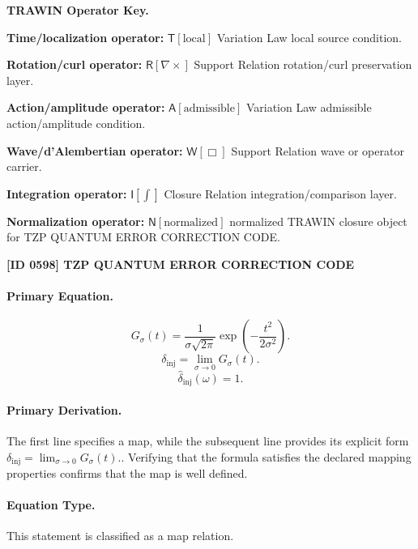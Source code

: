 \par\vspace{0.45\baselineskip}
\noindent\begin{minipage}[t]{\linewidth}
\begingroup
\small
\raggedright
\textbf{TRAWIN Operator Key.}\par
\noindent\textbf{Time/localization operator:} $\mathsf{T}\!\left[\mathrm{local}\right]$ Variation Law local source condition.\par
\noindent\textbf{Rotation/curl operator:} $\mathsf{R}\!\left[\nabla\times\right]$ Support Relation rotation/curl preservation layer.\par
\noindent\textbf{Action/amplitude operator:} $\mathsf{A}\!\left[\mathrm{admissible}\right]$ Variation Law admissible action/amplitude condition.\par
\noindent\textbf{Wave/d'Alembertian operator:} $\mathsf{W}\!\left[\Box\right]$ Support Relation wave or operator carrier.\par
\noindent\textbf{Integration operator:} $\mathsf{I}\!\left[\int\right]$ Closure Relation integration/comparison layer.\par
\noindent\textbf{Normalization operator:} $\mathsf{N}\!\left[\mathrm{normalized}\right]$ normalized TRAWIN closure object for TZP QUANTUM ERROR CORRECTION CODE.\par
\endgroup
\end{minipage}

\clearpage
\noindent\textbf{[ID 0598] TZP QUANTUM ERROR CORRECTION CODE}\par
\vspace{0.35em}
\paragraph{Primary Equation.}
\[
G_{\sigma}(t) = \frac{1}{\sigma\sqrt{2\pi}} \exp\left( -\frac{t^2}{2\sigma^2} \right).
\]
\[
\delta_{\mathrm{inj}} = \lim_{\sigma\to0}G_{\sigma}(t).
\]
\[
\widehat{\delta}_{\mathrm{inj}}(\omega)=1.
\]

\paragraph{Primary Derivation.}
The first line specifies a map, while the subsequent line provides its explicit form \( \delta_{\mathrm{inj}} = \lim_{\sigma\to0}G_{\sigma}(t). \). Verifying that the formula satisfies the declared mapping properties confirms that the map is well defined.
\paragraph{Equation Type.}
This statement is classified as a map relation.

